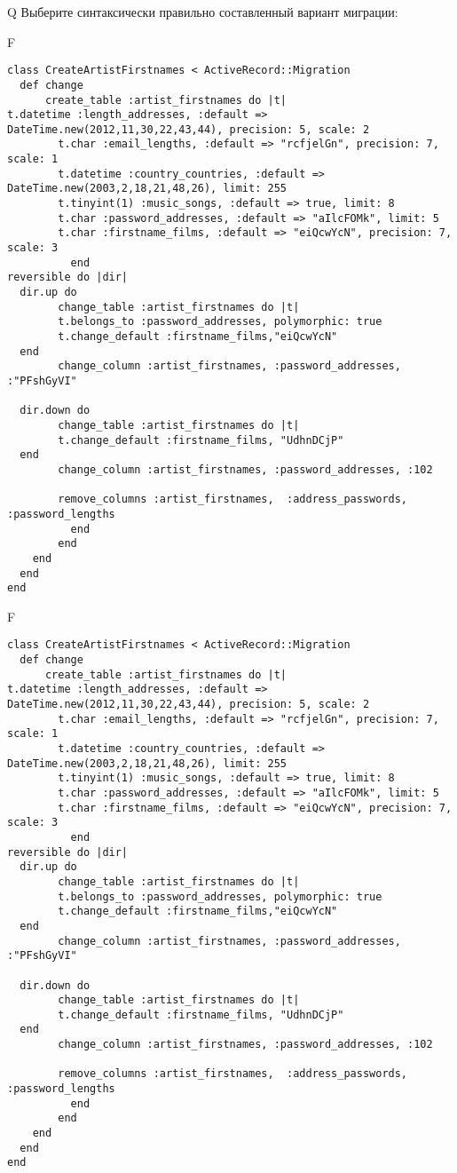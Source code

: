 Q
Выберите синтаксически правильно составленный вариант миграции:

F
\begin{verbatim}
class CreateArtistFirstnames < ActiveRecord::Migration
  def change
	  create_table :artist_firstnames do |t|
t.datetime :length_addresses, :default => DateTime.new(2012,11,30,22,43,44), precision: 5, scale: 2
		t.char :email_lengths, :default => "rcfjelGn", precision: 7, scale: 1
		t.datetime :country_countries, :default => DateTime.new(2003,2,18,21,48,26), limit: 255
		t.tinyint(1) :music_songs, :default => true, limit: 8
		t.char :password_addresses, :default => "aIlcFOMk", limit: 5
		t.char :firstname_films, :default => "eiQcwYcN", precision: 7, scale: 3
		  end
reversible do |dir|
  dir.up do
		change_table :artist_firstnames do |t|
		t.belongs_to :password_addresses, polymorphic: true
 		t.change_default :firstname_films,"eiQcwYcN"
  end
 		change_column :artist_firstnames, :password_addresses, :"PFshGyVI"
   
  dir.down do
		change_table :artist_firstnames do |t|
		t.change_default :firstname_films, "UdhnDCjP"
  end
 		change_column :artist_firstnames, :password_addresses, :102
   
		remove_columns :artist_firstnames,  :address_passwords, :password_lengths 
	      end
	    end
    end 
  end
end

\end{verbatim}

F
\begin{verbatim}
class CreateArtistFirstnames < ActiveRecord::Migration
  def change
	  create_table :artist_firstnames do |t|
t.datetime :length_addresses, :default => DateTime.new(2012,11,30,22,43,44), precision: 5, scale: 2
		t.char :email_lengths, :default => "rcfjelGn", precision: 7, scale: 1
		t.datetime :country_countries, :default => DateTime.new(2003,2,18,21,48,26), limit: 255
		t.tinyint(1) :music_songs, :default => true, limit: 8
		t.char :password_addresses, :default => "aIlcFOMk", limit: 5
		t.char :firstname_films, :default => "eiQcwYcN", precision: 7, scale: 3
		  end
reversible do |dir|
  dir.up do
		change_table :artist_firstnames do |t|
		t.belongs_to :password_addresses, polymorphic: true
 		t.change_default :firstname_films,"eiQcwYcN"
  end
 		change_column :artist_firstnames, :password_addresses, :"PFshGyVI"
   
  dir.down do
		change_table :artist_firstnames do |t|
		t.change_default :firstname_films, "UdhnDCjP"
  end
 		change_column :artist_firstnames, :password_addresses, :102
   
		remove_columns :artist_firstnames,  :address_passwords, :password_lengths 
	      end
	    end
    end 
  end
end

\end{verbatim}

